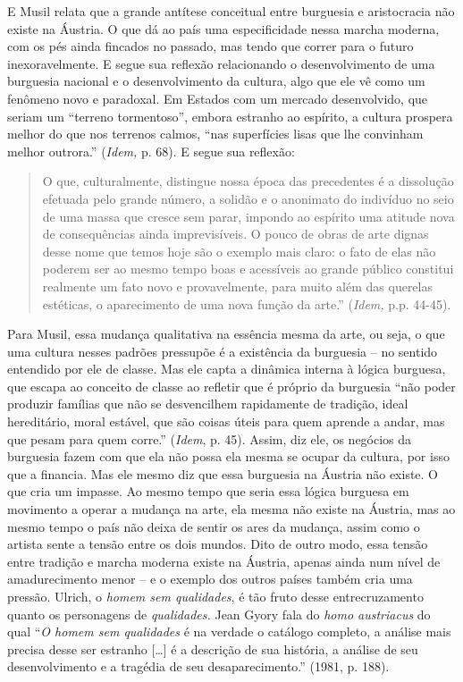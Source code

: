 E Musil relata que a grande antítese conceitual entre burguesia e
aristocracia não existe na Áustria. O que dá ao país uma especificidade
nessa marcha moderna, com os pés ainda fincados no passado, mas tendo
que correr para o futuro inexoravelmente. E segue sua reflexão
relacionando o desenvolvimento de uma burguesia nacional e o
desenvolvimento da cultura, algo que ele vê como um fenômeno novo e
paradoxal. Em Estados com um mercado desenvolvido, que seriam um
``terreno tormentoso'', embora estranho ao espírito, a cultura prospera
melhor do que nos terrenos calmos, ``nas superfícies lisas que lhe
convinham melhor outrora.'' (\emph{Idem,} p. 68). E segue sua reflexão:

\begin{quote}
O que, culturalmente, distingue nossa época das precedentes é a
dissolução efetuada pelo grande número, a solidão e o anonimato do
indivíduo no seio de uma massa que cresce sem parar, impondo ao espírito
uma atitude nova de consequências ainda imprevisíveis. O pouco de obras
de arte dignas desse nome que temos hoje são o exemplo mais claro: o
fato de elas não poderem ser ao mesmo tempo boas e acessíveis ao grande
público constitui realmente um fato novo e provavelmente, para muito
além das querelas estéticas, o aparecimento de uma nova função da
arte.'' (\emph{Idem,} p.p. 44-45).
\end{quote}

Para Musil, essa mudança qualitativa na essência mesma da arte, ou seja,
o que uma cultura nesses padrões pressupõe é a existência da burguesia
-- no sentido entendido por ele de classe. Mas ele capta a dinâmica
interna à lógica burguesa, que escapa ao conceito de classe ao refletir
que é próprio da burguesia ``não poder produzir famílias que não se
desvencilhem rapidamente de tradição, ideal hereditário, moral estável,
que são coisas úteis para quem aprende a andar, mas que pesam para quem
corre.'' (\emph{Idem}, p. 45). Assim, diz ele, os negócios da burguesia
fazem com que ela não possa ela mesma se ocupar da cultura, por isso que
a financia. Mas ele mesmo diz que essa burguesia na Áustria não existe.
O que cria um impasse. Ao mesmo tempo que seria essa lógica burguesa em
movimento a operar a mudança na arte, ela mesma não existe na Áustria,
mas ao mesmo tempo o país não deixa de sentir os ares da mudança, assim
como o artista sente a tensão entre os dois mundos. Dito de outro modo,
essa tensão entre tradição e marcha moderna existe na Áustria, apenas
ainda num nível de amadurecimento menor -- e o exemplo dos outros países
também cria uma pressão. Ulrich, o \emph{homem sem qualidades}, é tão
fruto desse entrecruzamento quanto os personagens de \emph{qualidades.}
Jean Gyory fala do \emph{homo austriacus} do qual ``\emph{O homem sem
qualidades} é na verdade o catálogo completo, a análise mais precisa
desse ser estranho [\ldots{}] é a descrição de sua história, a
análise de seu desenvolvimento e a tragédia de seu desaparecimento.''
(1981, p. 188).

